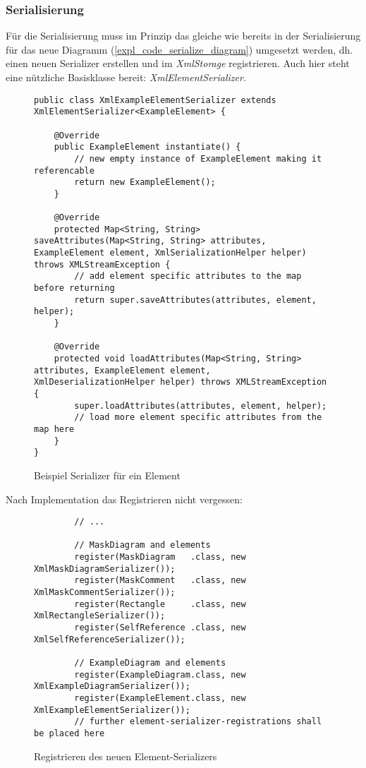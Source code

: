 \subsubsection{Serialisierung}
Für die Serialisierung muss im Prinzip das gleiche wie bereits in der Serialisierung für das neue Diagramm
(\ref{expl_code_serialize_diagram}) umgesetzt werden, dh. einen neuen Serializer  erstellen und im \textit{XmlStorage}
registrieren. Auch hier steht eine nützliche Basisklasse bereit: \textit{XmlElementSerializer}.
\begin{figure}[H]
	\centering
	\begin{lstlisting}
public class XmlExampleElementSerializer extends XmlElementSerializer<ExampleElement> {

    @Override
    public ExampleElement instantiate() {
        // new empty instance of ExampleElement making it referencable
        return new ExampleElement();
    }

    @Override
    protected Map<String, String> saveAttributes(Map<String, String> attributes, ExampleElement element, XmlSerializationHelper helper) throws XMLStreamException {
        // add element specific attributes to the map before returning
        return super.saveAttributes(attributes, element, helper);
    }

    @Override
    protected void loadAttributes(Map<String, String> attributes, ExampleElement element, XmlDeserializationHelper helper) throws XMLStreamException {
        super.loadAttributes(attributes, element, helper);
        // load more element specific attributes from the map here
    }
}
	\end{lstlisting}
	\label{diagram_handler}
	\caption{Beispiel Serializer für ein Element}
\end{figure}

Nach Implementation das Registrieren nicht vergessen:
\begin{figure}[H]
	\centering
	\begin{lstlisting}
	    // ...
	
        // MaskDiagram and elements
        register(MaskDiagram   .class, new XmlMaskDiagramSerializer());
        register(MaskComment   .class, new XmlMaskCommentSerializer());
        register(Rectangle     .class, new XmlRectangleSerializer());
        register(SelfReference .class, new XmlSelfReferenceSerializer());
        
        // ExampleDiagram and elements
        register(ExampleDiagram.class, new XmlExampleDiagramSerializer());
        register(ExampleElement.class, new XmlExampleElementSerializer());
        // further element-serializer-registrations shall be placed here
	\end{lstlisting}
	\caption{Registrieren des neuen Element-Serializers}
\end{figure}


